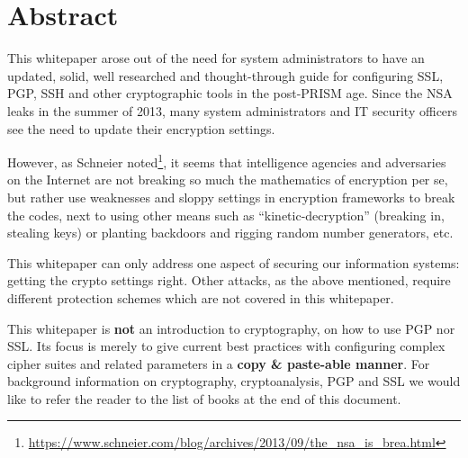 \section*{Abstract}

This whitepaper arose out of the need for system administrators to have an
updated, solid, well researched and thought-through guide for configuring SSL,
PGP, SSH and other cryptographic tools in the post-PRISM age.  Since the NSA
leaks in the summer of 2013, many system administrators and IT security
officers see the need to update their encryption settings.

However, as Schneier
noted\footnote{\url{https://www.schneier.com/blog/archives/2013/09/the\_nsa\_is\_brea.html}},
it seems that intelligence agencies and adversaries on the Internet are not
breaking so much the mathematics of encryption per se, but rather use
weaknesses and sloppy settings in encryption frameworks to break the codes,
next to using other means such as ``kinetic-decryption'' (breaking in, stealing
keys) or planting backdoors and rigging random number generators, etc.

This whitepaper can only address one aspect of securing our
information systems: getting the crypto settings right. Other attacks, as the
above mentioned, require different protection schemes which are not covered in
this whitepaper. 

This whitepaper is \textbf{not} an introduction to cryptography, on how to use
PGP nor SSL. Its focus is merely to give current best practices with
configuring complex cipher suites and related parameters in a \textbf{copy \&
paste-able manner}.  For background information on cryptography,
cryptoanalysis, PGP and SSL we would like to refer the reader to the list of
books at the end of this document.
